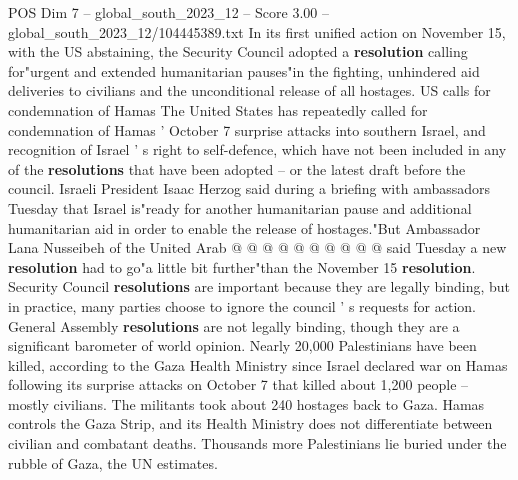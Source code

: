 \begin{textsample}{POS Dim 7 – global\_south\_2023\_12 – Score 3.00 – global\_south\_2023\_12/104445389.txt}
In its first unified action on November 15, with the US abstaining, the Security Council adopted a \textbf{resolution} calling for"urgent and extended humanitarian pauses"in the fighting, unhindered aid deliveries to civilians and the unconditional release of all hostages.
US calls for condemnation of Hamas The United States has repeatedly called for condemnation of Hamas ' October 7 surprise attacks into southern Israel, and recognition of Israel ' s right to self-defence, which have not been included in any of the \textbf{resolutions} that have been adopted -- or the latest draft before the council.
Israeli President Isaac Herzog said during a briefing with ambassadors Tuesday that Israel is"ready for another humanitarian pause and additional humanitarian aid in order to enable the release of hostages."But Ambassador Lana Nusseibeh of the United Arab @ @ @ @ @ @ @ @ @ @ said Tuesday a new \textbf{resolution} had to go"a little bit further"than the November 15 \textbf{resolution}.
Security Council \textbf{resolutions} are important because they are legally binding, but in practice, many parties choose to ignore the council ' s requests for action.
General Assembly \textbf{resolutions} are not legally binding, though they are a significant barometer of world opinion.
Nearly 20,000 Palestinians have been killed, according to the Gaza Health Ministry since Israel declared war on Hamas following its surprise attacks on October 7 that killed about 1,200 people -- mostly civilians.
The militants took about 240 hostages back to Gaza.
Hamas controls the Gaza Strip, and its Health Ministry does not differentiate between civilian and combatant deaths.
Thousands more Palestinians lie buried under the rubble of Gaza, the UN estimates.

\end{textsample}
